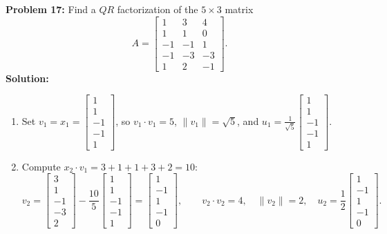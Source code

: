 \documentclass[11pt, letterpaper]{article}
\theoremstyle{definition}
\theoremstyle{remark}
\begin{document}
\vspace{0.8em}

\textbf{Problem 17:} Find a $QR$ factorization of the $5 \times 3$ matrix
\[
    A = \begin{bmatrix}
        1 & 3 & 4 \\
        1 & 1 & 0 \\
        -1 & -1 & 1 \\
        -1 & -3 & -3 \\
        1 & 2 & -1
    \end{bmatrix}.
\]
\textbf{Solution:}
\begin{enumerate}[label=\textbf{Step \arabic*:}]
    \item Set $v_1 = x_1 = \begin{bmatrix} 1 \\ 1 \\ -1 \\ -1 \\ 1 \end{bmatrix}$, so $v_1 \cdot v_1 = 5$, $\|v_1\| = \sqrt{5}$, and $u_1 = \frac{1}{\sqrt{5}}\begin{bmatrix} 1 \\ 1 \\ -1 \\ -1 \\ 1 \end{bmatrix}$.
    \item Compute $x_2 \cdot v_1 = 3 + 1 + 1 + 3 + 2 = 10$:
    \[
        v_2 = \begin{bmatrix} 3 \\ 1 \\ -1 \\ -3 \\ 2 \end{bmatrix} - \frac{10}{5}\begin{bmatrix} 1 \\ 1 \\ -1 \\ -1 \\ 1 \end{bmatrix} = \begin{bmatrix} 1 \\ -1 \\ 1 \\ -1 \\ 0 \end{bmatrix}, \qquad v_2 \cdot v_2 = 4, \quad \|v_2\| = 2, \quad u_2 = \frac{1}{2}\begin{bmatrix} 1 \\ -1 \\ 1 \\ -1 \\ 0 \end{bmatrix}.
\]
\end{enumerate}
\end{document}
